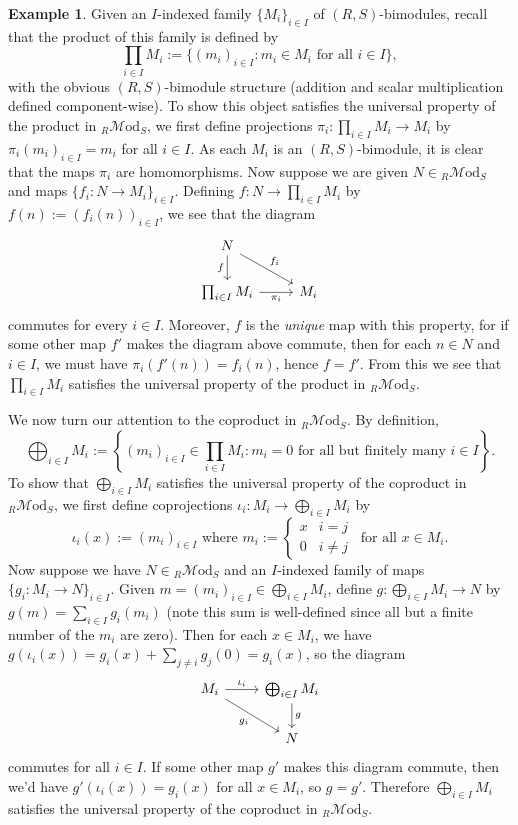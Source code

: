 \documentclass[10pt,oneside]{book}
\def\~#1{\mathscr{#1}}
\newcommand{\Mod}{\~M\mathrm{od}}
\theoremstyle{plain}
\theoremstyle{definition}
\newtheorem{ex}[thm]{Example}
\theoremstyle{remark}
\numberwithin{equation}{section}
\numberwithin{figure}{section}
\begin{document}
\begin{ex}
 Given an $I$-indexed family $\{M_i\}_{i \in I}$ of $(R,S)$-bimodules, recall that the product of this family is defined by
    \[\prod_{i\in I} M_i := \{(m_i)_{i \in I} : m_i \in M_i \text{ for all } i \in I\},\]
    with the obvious $(R,S)$-bimodule structure (addition and scalar multiplication defined component-wise). To show this object satisfies the universal property of the product in $_R\Mod_S$, we first define projections $\pi_i: \prod_{i \in I}M_i \to M_i$ by $\pi_i(m_i)_{i \in I} = m_i$ for all $i \in I$. As each $M_i$ is an $(R,S)$-bimodule, it is clear that the maps $\pi_i$ are homomorphisms. Now suppose we are given $N \in {}_R\Mod_S$ and maps $\{f_i: N \to M_i\}_{i \in I}$. Defining $f: N \to \prod_{i \in I}M_i$ by $f(n) := (f_i(n))_{i \in I}$, we see that the diagram
    \[
        \begin{tikzcd}
            N \\
            {\prod_{i \in I}M_i} & {M_i}
            \arrow["f"', from=1-1, to=2-1]
            \arrow["{f_i}", from=1-1, to=2-2]
            \arrow["{\pi_i}"', from=2-1, to=2-2]
        \end{tikzcd}
    \]
    commutes for every $i \in I$. Moreover, $f$ is the \emph{unique} map with this property, for if some other map $f'$ makes the diagram above commute, then for each $n \in N$ and $i \in I$, we must have $\pi_i(f'(n)) = f_i(n)$, hence $f = f'$. From this we see that $\prod_{i \in I}M_i$ satisfies the universal property of the product in $_R\Mod_S$.

    We now turn our attention to the coproduct in $_R\Mod_S$. By definition,
    \[\bigoplus_{i \in I}M_i := \left\{(m_i)_{i\in I} \in \prod_{i \in I}M_i : m_i = 0 \text{ for all but finitely many } i \in I \right\}.\]
    To show that $\bigoplus_{i \in I}M_i$ satisfies the universal property of the coproduct in $_R\Mod_S$, we first define coprojections $\iota_i: M_i \to \bigoplus_{i \in I}M_i$ by 
    \[\iota_i (x) := (m_i)_{i \in I} \text{ where } m_i := \begin{cases}x & i = j \\ 0 & i \ne j \end{cases}\, \text{ for all } x \in M_i.\]
    Now suppose we have $N \in {}_R\Mod_S$ and an $I$-indexed family of maps $\{g_i: M_i \to N\}_{i \in I}$. Given $m = (m_i)_{i \in I} \in \bigoplus_{i \in I} M_i$, define $g: \bigoplus_{i \in I} M_i \to N$ by $g(m) = \sum_{i \in I} g_i(m_i)$ (note this sum is well-defined since all but a finite number of the $m_i$ are zero). Then for each $x \in M_i$, we have $g(\iota_i(x)) = g_i(x) + \sum_{j \ne i} g_j(0) = g_i(x)$, so the diagram
    \[\begin{tikzcd}
    {M_i} & {\bigoplus_{i \in I}M_i} \\
    & N
    \arrow["{\iota_i}", from=1-1, to=1-2]
    \arrow["{g_i}"', from=1-1, to=2-2]
    \arrow["g", from=1-2, to=2-2]\end{tikzcd}\]
    commutes for all $i \in I$. If some other map $g'$ makes this diagram commute, then we'd have $g'(\iota_i(x)) = g_i(x)$ for all $x \in M_i$, so $g = g'$. Therefore $\bigoplus_{i \in I}M_i$ satisfies the universal property of the coproduct in ${}_R \Mod_S$.
\end{ex}
\end{document}
